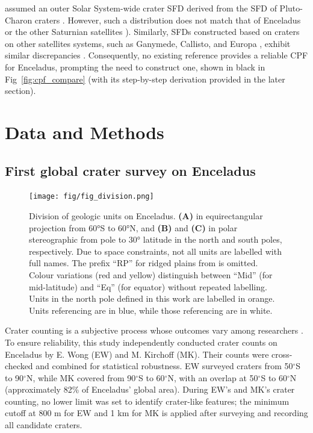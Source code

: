 \documentclass[preprint,11pt,3p,times,authoryear]{elsarticle}
\begin{document}
\citet{Wong2023} assumed an outer Solar System-wide crater SFD derived from the SFD of Pluto-Charon craters \citep[red line in Fig~\ref{fig:cpf_compare}]{Singer2019}. However, such a distribution does not match that of Enceladus or the other Saturnian satellites \citep[blue line]{Kirchoff2022}). Similarly, SFDs constructed based on craters on other satellites systems, such as Ganymede, Callisto, and Europa \citep[orange line]{Zahnle2003}, exhibit similar discrepancies \citep{Wong2023}. Consequently, no existing reference provides a reliable CPF for Enceladus, prompting the need to construct one, shown in black in Fig~\ref{fig:cpf_compare} (with its step-by-step derivation provided in the later section). \\


\section{Data and Methods}
\label{sec:data}

\subsection{First global crater survey on Enceladus}
\label{subsec:crater_count}

\begin{figure}[ht!]
    \centering
    \texttt{[image: fig/fig\_division.png]}
    \caption{Division of geologic units on Enceladus. \textbf{(A)} in equirectangular projection from  60°S to  60°N, and \textbf{(B)} and \textbf{(C)}  in polar stereographic from pole to 30° latitude in the north and south poles, respectively. Due to space constraints, not all units are labelled with full names. The prefix “RP” for ridged plains from \citet{Kirchoff2009} is omitted. Colour variations (red and yellow) distinguish between “Mid” (for mid-latitude) and “Eq” (for equator) without repeated labelling. Units in the north pole defined in this work are labelled in orange. Units referencing \citet{Kirchoff2009} are in blue, while those referencing \citet{CrowWillard2015} are in white. }
    \label{fig:division}
\end{figure}

Crater counting is a subjective process whose outcomes vary among researchers \citep{Robbins2014}. To ensure reliability, this study independently conducted crater counts on Enceladus by E. Wong (EW) and M. Kirchoff (MK). Their counts were cross-checked and combined for statistical robustness. EW surveyed craters from 50$^\circ$S to 90$^\circ$N, while MK covered from 90$^\circ$S to 60$^\circ$N, with an overlap at 50$^\circ$S to 60$^\circ$N (approximately 82\% of Enceladus' global area). During EW’s and MK’s crater counting, no lower limit was set to identify crater-like features; the minimum cutoff at 800 m for EW and 1 km for MK is applied after surveying and recording all candidate craters.\\
\end{document}
